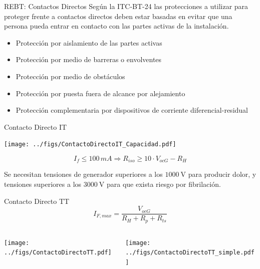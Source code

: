 \documentclass[aspectratio=169, usenames,svgnames,dvipsnames]{beamer}
\begin{document}
\begin{frame}[label={sec:orgbfa7634}]{REBT: Contactos Directos}
Según la ITC-BT-24 las protecciones a utilizar para proteger frente a
contactos directos deben estar \alert{basadas en evitar que una persona pueda
entrar en contacto con las partes activas} de la instalación.

\begin{itemize}
\item Protección por \alert{aislamiento de las partes activas}

\item Protección por medio de \alert{barreras o envolventes}

\item Protección por medio de \alert{obstáculos}

\item Protección por puesta \alert{fuera de alcance} por alejamiento

\item Protección complementaria por \alert{dispositivos de corriente
diferencial}-residual
\end{itemize}
\end{frame}


\begin{frame}[label={sec:org66af186}]{Contacto Directo IT}
\begin{center}
\texttt{[image: ../figs/ContactoDirectoIT\_Capacidad.pdf]}
\end{center}

$$I_{f}\leq100\, mA\Longrightarrow R_{iso}\geq10\cdot V_{ocG}-R_{H}$$

Se necesitan tensiones de generador superiores a los \(\SI{1000}{\volt}\)
para producir dolor, y tensiones superiores a los \(\SI{3000}{\volt}\)
para que exista riesgo por fibrilación.
\end{frame}

\begin{frame}[label={sec:orga8fb35f}]{Contacto Directo TT}
$$I_{F,max}=\frac{V_{ocG}}{R_{H}+R_{p}+R_{ts}}$$

\begin{columns}
\begin{column}{0.5\columnwidth}
\begin{center}
\texttt{[image: ../figs/ContactoDirectoTT.pdf]}
\end{center}
\end{column}

\begin{column}{0.5\columnwidth}
\begin{center}
\texttt{[image: ../figs/ContactoDirectoTT\_simple.pdf]}
\end{center}
\end{column}
\end{columns}
\end{frame}
\end{document}
